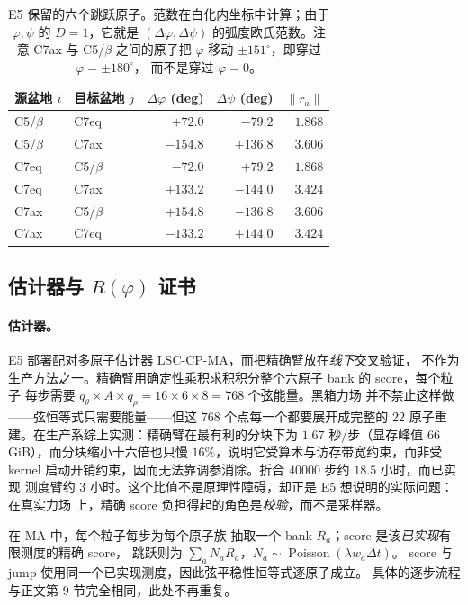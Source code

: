 \documentclass[11pt,a4paper]{article}
\renewcommand{\textsc}[1]{\textsf{\MakeUppercase{#1}}}
\begin{document}
\begin{table}[H]
\centering
\small
\begin{tabular}{llrrr}
\toprule
源盆地 $i$ & 目标盆地 $j$ & $\Delta\varphi$ (deg) & $\Delta\psi$ (deg) & $\|r_a\|$ \\
\midrule
C5/$\beta$ & C7eq & $+72.0$ & $-79.2$ & $1.868$ \\
C5/$\beta$ & C7ax & $-154.8$ & $+136.8$ & $3.606$ \\
C7eq & C5/$\beta$ & $-72.0$ & $+79.2$ & $1.868$ \\
C7eq & C7ax & $+133.2$ & $-144.0$ & $3.424$ \\
C7ax & C5/$\beta$ & $+154.8$ & $-136.8$ & $3.606$ \\
C7ax & C7eq & $-133.2$ & $+144.0$ & $3.424$ \\
\bottomrule
\end{tabular}
\caption{E5 保留的六个跳跃原子。范数在白化内坐标中计算；由于 $\varphi,\psi$ 的
$D=1$，它就是 $(\Delta\varphi,\Delta\psi)$ 的弧度欧氏范数。注意 C7ax 与 C5/$\beta$
之间的原子把 $\varphi$ 移动 $\pm151^\circ$，即穿过 $\varphi=\pm180^\circ$，
而不是穿过 $\varphi=0$。}
\end{table}

\subsection{估计器与 \texorpdfstring{$R(\varphi)$}{R(phi)} 证书}

\paragraph{估计器。}
E5 部署配对多原子估计器 \textsc{lsc-cp-ma}，而把精确臂放在\emph{线下}交叉验证，
不作为生产方法之一。精确臂用确定性乘积求积积分整个六原子 bank 的 score，每个粒子
每步需要 $q_\theta\times A\times q_\rho=16\times6\times8=768$ 个弦能量。黑箱力场
并不禁止这样做——弦恒等式只需要能量——但这 $768$ 个点每一个都要展开成完整的 $22$
原子重建。在生产系综上实测：精确臂在最有利的分块下为 $1.67$ 秒/步（显存峰值
$66$ GiB），而分块缩小十六倍也只慢 $16\%$，说明它受算术与访存带宽约束，而非受
kernel 启动开销约束，因而无法靠调参消除。折合 $40000$ 步约 $18.5$ 小时，而已实现
测度臂约 $3$ 小时。这个比值不是原理性障碍，却正是 E5 想说明的实际问题：在真实力场
上，精确 score 负担得起的角色是\emph{校验}，而不是采样器。

在 MA 中，每个粒子每步为每个原子族
抽取一个 bank $R_a$；score 是该\emph{已实现}有限测度的精确 score，
跳跃则为 $\sum_aN_aR_a$，$N_a\sim\operatorname{Poisson}(\lambda w_a\Delta t)$。
score 与 jump 使用同一个已实现测度，因此弦平稳性恒等式逐原子成立。
具体的逐步流程与正文第 9 节完全相同，此处不再重复。
\end{document}
